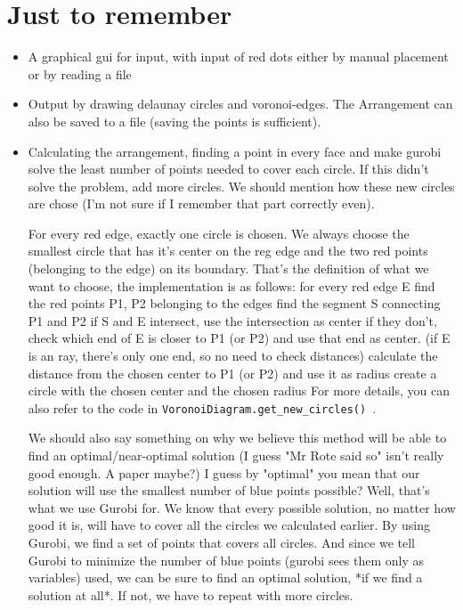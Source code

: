 \documentclass[a4paper,12pt]{article}
\begin{document}
\section{Just to remember}
\begin{itemize}
\item
A graphical gui for input, with input of red dots either by manual placement or by reading a file
\item
Output by drawing delaunay circles and voronoi-edges.
The Arrangement can also be saved to a file (saving the points is sufficient).
\item
Calculating the arrangement, finding a point in every face and make gurobi solve the least number of points needed to cover each circle.
If this didn't solve the problem, add more circles. We should mention how these new circles are chose (I'm not sure if I remember that part correctly even). 

For every red edge, exactly one circle is chosen. We always choose the smallest circle that has it's center on the reg edge and the two red points (belonging to the edge) on its boundary.
That's the definition of what we want to choose, the implementation is as follows:
	for every red edge E {
		find the red points P1, P2 belonging to the edges
		find the segment S connecting P1 and P2
		if S and E intersect, use the intersection as center
		if they don't, check which end of E is closer to P1 (or P2) and use that end as center. (if E is an ray, there's only one end, so no need to check distances)
		calculate the distance from the chosen center to P1 (or P2) and use it as radius
		create a circle with the chosen center and the chosen radius
		}
For more details, you can also refer to the code in \texttt{VoronoiDiagram.get\_new\_circles() }.

We should also say something on why we believe this method will be able to find an optimal/near-optimal solution (I guess "Mr Rote said so" isn't really good enough. A paper maybe?)
I guess by "optimal" you mean that our solution will use the smallest number of blue points possible? Well, that's what we use Gurobi for. 
We know that every possible solution, no matter how good it is, will have to cover all the circles we calculated earlier.
By using Gurobi, we find a set of points that covers all circles. And since we tell Gurobi to minimize the number of blue points (gurobi sees them only as variables) used, we can be sure to find an optimal solution, *if we find a solution at all*. If not, we have to repeat with more circles.
\end{itemize}
\end{document}
